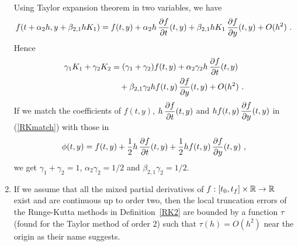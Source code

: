 \begin{rmkList}
\begin{enumerate}
Using Taylor expansion theorem in two variables, we have
\[
f(t+\alpha_2 h,y+\beta_{2,1} h K_1) = f(t,y) +
\alpha_2 h\, \frac{\partial{f}}{\partial{t}}(t,y) + \beta_{2,1} h K_1 \, \frac{\partial{f}}{\partial{y}}(t,y)
+ O(h^2) \ .
\]
Hence
\begin{equation}\label{RKmatch}
\begin{split}
\gamma_1 K_1 + \gamma_2 K_2 &= (\gamma_1+\gamma_2)f(t,y)
+ \alpha_{2} \gamma_2 h \, \frac{\partial{f}}{\partial{t}}(t,y) \\
&\quad + \beta_{2,1} \gamma_2 h f(t,y) \, \frac{\partial{f}}{\partial{y}}(t,y) + O(h^2) \ .
\end{split}
\end{equation}
If we match the coefficients of $f(t,y)$,
$\displaystyle h\, \frac{\partial{f}}{\partial{t}}(t,y)$ and 
$\displaystyle h f(t,y)\, \frac{\partial{f}}{\partial{y}}(t,y)$ in 
(\ref{RKmatch}) with those in
\[
\phi(t,y) = f(t,y) + \frac{1}{2} h \, \frac{\partial{f}}{\partial{t}}(t,y) + \frac{1}{2}
h f(t,y) \, \frac{\partial{f}}{\partial{y}}(t,y) \ ,
\]
we get $\gamma_1+\gamma_2=1$, $\alpha_{2} \gamma_2 = 1/2$ and
$\beta_{2,1} \gamma_2 = 1/2$.
\item If we assume that all the mixed partial derivatives of
$f:[t_0,t_f]\times \mathbb{R} \rightarrow \mathbb{R}$ exist and are continuous up to
order two, then the local truncation errors of the Runge-Kutta methods
in Definition~\ref{RK2} are bounded by a function $\tau$ (found for the
Taylor method of order $2$) such that $\tau(h) = O(h^2)$ near the
origin as their name suggests.
\end{enumerate}
\end{rmkList}

